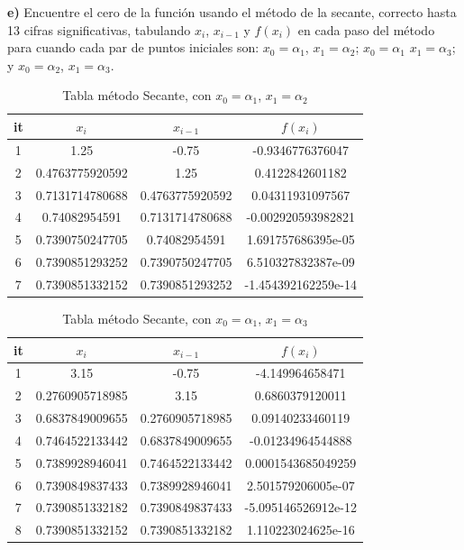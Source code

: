 \documentclass{article} %
\begin{document}
\newpage

\textbf{e)} Encuentre el cero de la función usando el método de la secante, correcto hasta
13 cifras significativas, tabulando $x_i$, $x_{i-1}$ y $f(x_i)$ en cada paso del método para cuando cada par de puntos iniciales son: $x_0 = \alpha_1$, $x_1 = \alpha_2$; $x_0 = \alpha_1$ $x_1 = \alpha_3$; y $x_0 = \alpha_2$, $x_1 = \alpha_3$. 

\begin{table}[H]
\centering
\begin{tabular}{|c|c|c|c|}
\hline
it & $x_i$ & $x_{i-1}$ & $f(x_i)$\\
\hline
1 & 1.25 & -0.75 & -0.9346776376047\\
2 & 0.4763775920592 & 1.25 & 0.4122842601182\\
3 & 0.7131714780688 & 0.4763775920592 & 0.04311931097567\\
4 & 0.74082954591 & 0.7131714780688 & -0.002920593982821\\
5 & 0.7390750247705 & 0.74082954591 & 1.691757686395e-05\\
6 & 0.7390851293252 & 0.7390750247705 & 6.510327832387e-09\\
7 & 0.7390851332152 & 0.7390851293252 & -1.454392162259e-14\\
\hline
\end{tabular}
\caption{Tabla método Secante, con $x_0 = \alpha_1$, $x_1 = \alpha_2$}
\end{table}

\begin{table}[H]
\centering
\begin{tabular}{|c|c|c|c|}
\hline
it & $x_i$ & $x_{i-1}$ & $f(x_i)$\\
\hline
1 & 3.15 & -0.75 & -4.149964658471\\
2 & 0.2760905718985 & 3.15 & 0.6860379120011\\
3 & 0.6837849009655 & 0.2760905718985 & 0.09140233460119\\
4 & 0.7464522133442 & 0.6837849009655 & -0.01234964544888\\
5 & 0.7389928946041 & 0.7464522133442 & 0.0001543685049259\\
6 & 0.7390849837433 & 0.7389928946041 & 2.501579206005e-07\\
7 & 0.7390851332182 & 0.7390849837433 & -5.095146526912e-12\\
8 & 0.7390851332152 & 0.7390851332182 & 1.110223024625e-16\\
\hline
\end{tabular}
\caption{Tabla método Secante, con $x_0 = \alpha_1$, $x_1 = \alpha_3$}
\end{table}
\end{document}
